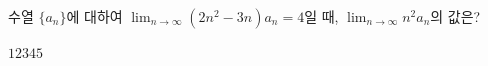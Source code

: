 수열 $\{a_n\}$에 대하여 $\displaystyle\lim_{n\to\infty}(2n^2-3n)a_n=4$일 때, $\displaystyle\lim_{n\to\infty}n^2a_n$의 값은?
\begin{choices32}{$1$}{$2$}{$3$}{$4$}{$5$}\end{choices32}
